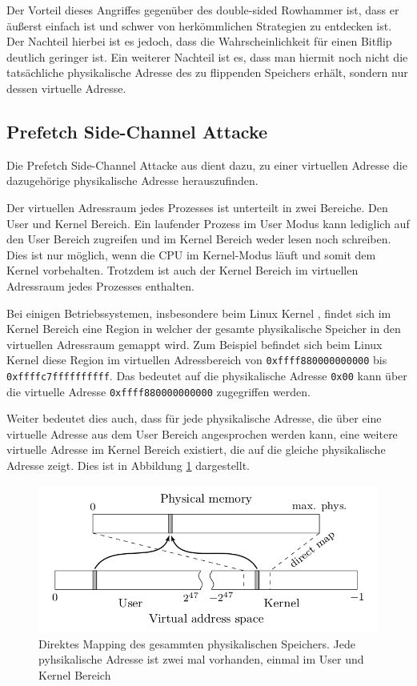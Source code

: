 \documentclass[conference]{IEEEtran}
\begin{document}
Der Vorteil dieses Angriffes gegenüber des double-sided Rowhammer ist, dass er äußerst einfach ist und schwer von herkömmlichen Strategien zu entdecken ist. Der Nachteil hierbei ist es jedoch, dass die Wahrscheinlichkeit für einen Bitflip deutlich geringer ist. Ein weiterer Nachteil ist es, dass man hiermit noch nicht die tatsächliche physikalische Adresse des zu flippenden Speichers erhält, sondern nur dessen virtuelle Adresse.

\subsection{Prefetch Side-Channel Attacke}

Die Prefetch Side-Channel Attacke aus \cite{DBLP:conf/ccs/2016} dient dazu, zu einer virtuellen Adresse die dazugehörige physikalische Adresse herauszufinden. 

Der virtuellen Adressraum jedes Prozesses ist unterteilt in zwei Bereiche. Den User und Kernel Bereich. Ein laufender Prozess im User Modus kann lediglich auf den User Bereich zugreifen und im Kernel Bereich weder lesen noch schreiben. Dies ist nur möglich, wenn die CPU im Kernel-Modus läuft und somit dem Kernel vorbehalten. Trotzdem ist auch der Kernel Bereich im virtuellen Adressraum jedes Prozesses enthalten.

Bei einigen Betriebssystemen, insbesondere beim Linux Kernel \cite{virtual-momory}, findet sich im Kernel Bereich eine Region in welcher der gesamte physikalische Speicher in den virtuellen Adressraum gemappt wird.
Zum Beispiel befindet sich beim Linux Kernel diese Region im virtuellen Adressbereich von \texttt{0xffff880000000000} bis \texttt{0xffffc7ffffffffff}.
Das bedeutet auf die physikalische Adresse \texttt{0x00} kann über die virtuelle Adresse \texttt{0xffff880000000000} zugegriffen werden.

Weiter bedeutet dies auch, dass für jede physikalische Adresse, die über eine virtuelle Adresse aus dem User Bereich angesprochen werden kann, eine weitere virtuelle Adresse im Kernel Bereich existiert, die auf die gleiche physikalische Adresse zeigt. Dies ist in Abbildung \ref{fig:direct-mapping} dargestellt.

\begin{figure}
	\centering
	\includegraphics[width=1\linewidth]{direct-mapping}
	\caption{Direktes Mapping des gesammten physikalischen Speichers. Jede pyhsikalische Adresse ist zwei mal vorhanden, einmal im User und Kernel Bereich \cite{DBLP:conf/ccs/2016}}
	\label{fig:direct-mapping}
\end{figure}
\end{document}
